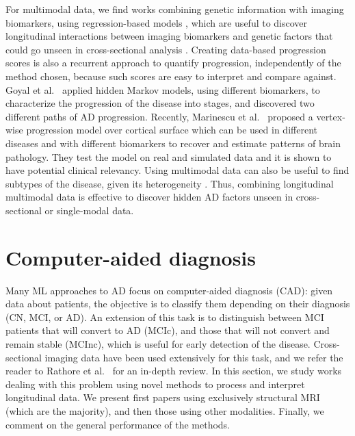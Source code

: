 For multimodal data, we find works combining genetic information with imaging biomarkers, using regression-based models \cite{Silver2012,Vounou2012}, which are useful to discover longitudinal interactions between imaging biomarkers and genetic factors that could go unseen in cross-sectional analysis \cite{Xu2014}. Creating data-based progression scores \cite{Casanova2018,Clark2012,Davatzikos2009,Jedynak2012,Schmidt-Richberg2015} is also a recurrent approach to quantify progression, independently of the method chosen, because such scores are easy to interpret and compare against. Goyal et al.\ \cite{Goyal2018b} applied hidden Markov models, using different biomarkers, to characterize the progression of the disease into stages, and discovered two different paths of AD progression. Recently, Marinescu et al.\ \cite{Marinescu2019} proposed a vertex-wise progression model over cortical surface which can be used in different diseases and with different biomarkers to recover and estimate patterns of brain pathology. They test the model on real and simulated data and it is shown to have potential clinical relevancy. Using multimodal data can also be useful to find subtypes of the disease, given its heterogeneity \cite{Gamberger2017}. Thus, combining longitudinal multimodal data is effective to discover hidden AD factors unseen in cross-sectional or single-modal data. \\

\section{Computer-aided diagnosis}
\label{sec:classification}

Many ML approaches to AD focus on computer-aided diagnosis (CAD): given data about patients, the objective is to classify them depending on their diagnosis (CN, MCI, or AD). An extension of this task is to distinguish between MCI patients that will convert to AD (MCIc), and those that will not convert and remain stable (MCInc), which is useful for early detection of the disease. Cross-sectional imaging data have been used extensively for this task, and we refer the reader to Rathore et al.\ \cite{Rathore2017} for an in-depth review. In this section, we study works dealing with this problem using novel methods to process and interpret longitudinal data. We present first papers using exclusively structural MRI (which are the majority), and then those using other modalities. Finally, we comment on the general performance of the methods. \\


